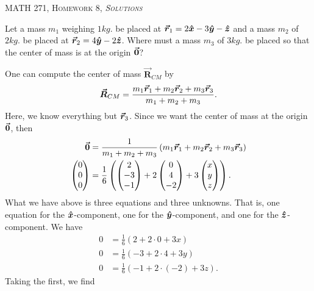 \documentclass[12pt]{article} %
\begin{document}
\begin{center}
   \textsc{\large MATH 271, Homework 8, \emph{Solutions}}\\
\end{center}
\vspace{.5cm}

\begin{problem}
Let a mass $m_1$ weighing $1kg.$ be placed at $\boldsymbol{\vec{r}}_1=2\boldsymbol{\hat{x}} -3 \boldsymbol{\hat{y}} -\boldsymbol{\hat{z}}$ and a mass $m_2$ of $2kg.$ be placed at $\boldsymbol{\vec{r}}_2 = 4\boldsymbol{\hat{y}} -2\boldsymbol{\hat{z}}$.  Where must a mass $m_3$ of $3kg.$ be placed so that the center of mass is at the origin $\boldsymbol{\vec{0}}$?
\end{problem}
\begin{solution}
One can compute the center of mass $\boldsymbol{\vec{R}}_{CM}$ by
\[
\boldsymbol{\vec{R}}_{CM} = \frac{m_1\boldsymbol{\vec{r}}_1 + m_2\boldsymbol{\vec{r}}_2 + m_3 \boldsymbol{\vec{r}}_3}{m_1 + m_2 + m_3}.
\]
Here, we know everything but $\boldsymbol{\vec{r}}_3$.  Since we want the center of mass at the origin $\boldsymbol{\vec{0}}$, then
\begin{align*}
\boldsymbol{\vec{0}} &= \frac{1}{m_1+m_2 + m_3} \left( m_1 \boldsymbol{\vec{r}}_1 + m_2 \boldsymbol{\vec{r}}_2 + m_3 \boldsymbol{\vec{r}}_3 \right)\\
\begin{pmatrix} 0 \\ 0 \\ 0\end{pmatrix}&= \frac{1}{6} \left( \begin{pmatrix} 2 \\ -3 \\ -1 \end{pmatrix} + 2 \begin{pmatrix} 0 \\ 4 \\ -2 \end{pmatrix} + 3 \begin{pmatrix} x \\ y \\ z \end{pmatrix}\right).
\end{align*}
What we have above is three equations and three unknowns. That is, one equation for the $\boldsymbol{\hat{x}}$-component, one for the $\boldsymbol{\hat{y}}$-component, and one for the $\boldsymbol{\hat{z}}$-component. We have
\begin{align*}
    0 & = \frac{1}{6} (2 + 2\cdot 0 + 3x)\\
    0 & = \frac{1}{6} (-3 + 2\cdot 4 + 3y)\\
    0 & = \frac{1}{6} (-1 +2\cdot (-2) + 3z).
\end{align*}
Taking the first, we find

\end{solution}
\end{document}
